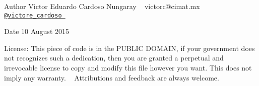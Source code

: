 \begin{DoxyAuthor}{Author}
Victor Eduardo Cardoso Nungaray ~\newline
 victorc@cimat.\+mx ~\newline
 \href{https://twitter.com/victore_cardoso}{\tt @victore\+\_\+cardoso } 
\end{DoxyAuthor}
\begin{DoxyDate}{Date}
10 August 2015
\end{DoxyDate}
\begin{DoxyParagraph}{License\+:}
This piece of code is in the P\+U\+B\+L\+I\+C D\+O\+M\+A\+I\+N, if your government does not recognizes such a dedication, then you are granted a perpetual and irrevocable license to copy and modify this file however you want. This does not imply any warranty. ~\newline
 Attributions and feedback are always welcome. 
\end{DoxyParagraph}
